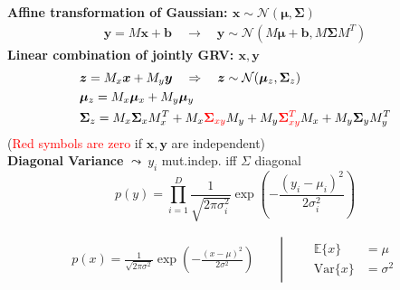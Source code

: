     \textbf{Affine transformation of Gaussian: $\boldsymbol{x} \sim \mathcal{N}(\boldsymbol{\mu},\boldsymbol{\Sigma})$}
    \begin{align*}
        \boldsymbol{y} = M \boldsymbol{x} + \boldsymbol{b} \quad \to \quad \boldsymbol{y} \sim \mathcal{N}(M \boldsymbol{\mu} + \boldsymbol{b}, M \boldsymbol{\Sigma} M^T)
    \end{align*}
    \textbf{Linear combination of jointly GRV: $\boldsymbol{x}, \boldsymbol{y}$}
    \begin{align*}
        &\boldsymbol{z} = M_x \boldsymbol{x} + M_y \boldsymbol{y} \quad \Rightarrow \quad \boldsymbol{z} \sim \mathcal{N}(\boldsymbol{\mu}_z, \boldsymbol{\Sigma}_z)\\
        &\boldsymbol{\mu}_z = M_x \boldsymbol{\mu}_x + M_y \boldsymbol{\mu}_y \\
        &\boldsymbol{\Sigma}_z = M_x \boldsymbol{\Sigma}_x M_x^T + M_x \textcolor{red}{\boldsymbol{\Sigma}_{xy}} M_y + M_y \textcolor{red}{\boldsymbol{\Sigma}_{xy}^T} M_x + M_y \boldsymbol{\Sigma}_y M_y^T
    \end{align*}
    (\textcolor{red}{Red symbols are zero} if $\boldsymbol{x}, \boldsymbol{y}$ are independent)\\
    \textbf{Diagonal Variance} $\leadsto \ y_i$ mut.indep. iff $\Sigma$ diagonal
    \begin{equation*}
        p(y) = \prod_{i=1}^{D} \textstyle\frac{1}{\sqrt{2\pi\sigma_i^2}} 
        \exp(-\frac{(y_i - \mu_i)^2}{2\sigma_i^2})
    \end{equation*}


    \begin{align*}
        p(x) = \frac{1}{\sqrt{2\pi\sigma^2}}\exp\left(-\frac{(x-\mu)^2}{2\sigma^2}\right)
        \qquad\left\lvert\qquad
        \begin{aligned}
            \mathbb{E}\{x\} &= \mu \\
            \mathrm{Var}\{x\} &= \sigma^2
        \end{aligned}
        \right.
    \end{align*}

    \vfill\null\columnbreak